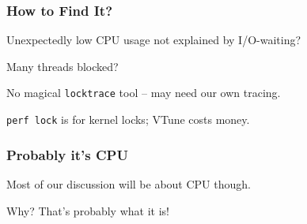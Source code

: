 \begin{frame}
\frametitle{How to Find It?}

Unexpectedly low CPU usage not explained by I/O-waiting?

Many threads blocked?

No magical \texttt{locktrace} tool -- may need our own tracing.

\texttt{perf lock} is for kernel locks; VTune costs money.

\end{frame}


\begin{frame}
\frametitle{Probably it's CPU}

Most of our discussion will be about CPU though.

Why? That's probably what it is!


\end{frame}



